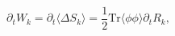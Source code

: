 \begin{equation}
\partial_t W_k=\partial_t \langle\Delta S_k\rangle
=\frac12\mathrm{Tr}\langle\phi\phi\rangle\partial_t R_k,
\end{equation}

